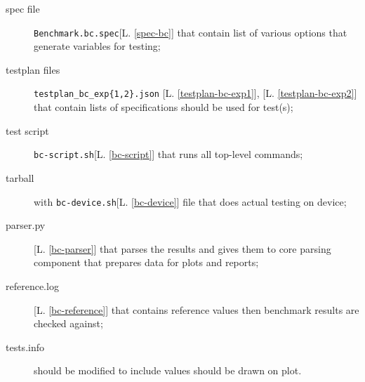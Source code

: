\begin{description}

\item[spec file] \texttt{Benchmark.bc.spec}[L. \ref{spec-bc}] that contain list of various options that generate variables for testing;
\item[testplan files] \texttt{testplan\_bc\_exp\{1,2\}.json} [L. \ref{testplan-bc-exp1}], [L. \ref{testplan-bc-exp2}] that contain lists of specifications should be used for test(s);
\item[test script] \texttt{bc-script.sh}[L. \ref{bc-script}] that runs all top-level commands;
\item[tarball] with \texttt{bc-device.sh}[L. \ref{bc-device}] file that does actual testing on device;
\item[parser.py] [L. \ref{bc-parser}] that parses the results and gives them to core parsing component that prepares data for plots and reports;
\item[reference.log] [L. \ref{bc-reference}] that contains reference values then benchmark results are checked against;
\item[tests.info] should be modified to include values should be drawn on plot.

\end{description}

